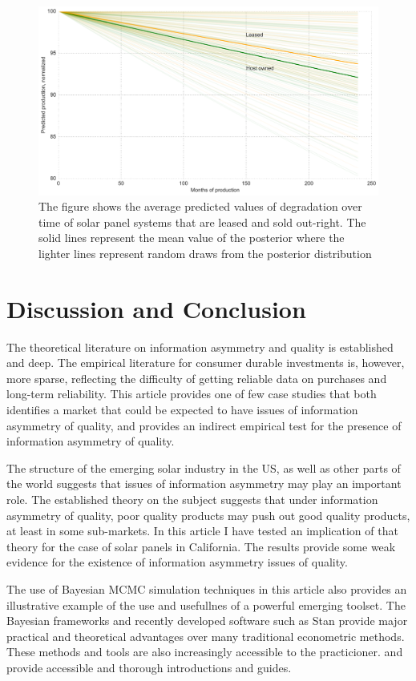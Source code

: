 \documentclass[12pt]{article}
\begin{document}
\begin{figure}
	\includegraphics[width=1\textwidth]{figures/predicted_deg.png}
	\caption{The figure shows the average predicted values of degradation over time of solar panel systems that are leased and sold out-right. The solid lines represent the mean value of the posterior where the lighter lines represent random draws from the posterior distribution}
	\label{predicted_deg}
\end{figure}

\section{Discussion and Conclusion}
The theoretical literature on information asymmetry and quality is established and deep. The empirical literature for consumer durable investments is, however, more sparse, reflecting the difficulty of getting reliable data on purchases and long-term reliability. This article provides one of few case studies that both identifies a market that could be expected to have issues of information asymmetry of quality, and provides an indirect empirical test for the presence of information asymmetry of quality. 

The structure of the emerging solar industry in the US, as well as other parts of the world suggests that issues of information asymmetry may play an important role. The established theory on the subject suggests that under information asymmetry of quality, poor quality products may push out good quality products, at least in some sub-markets. In this article I have tested an implication of that theory for the case of solar panels in California. The results provide some weak evidence for the existence of information asymmetry issues of quality.

The use of Bayesian MCMC simulation techniques in this article also provides an illustrative example of the use and usefullnes of a powerful emerging toolset. The Bayesian frameworks and recently developed software such as Stan provide major practical and theoretical advantages over many traditional econometric methods. These methods and tools are also increasingly accessible to the practicioner. \citet{kruschke_doing_2014} and \citet{stan_development_team_stan_2014} provide accessible and thorough introductions and guides.
\end{document}
